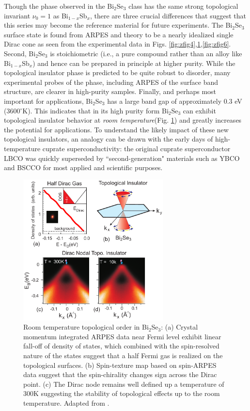\documentclass[twocolumn,floatfix,showpacs,rmp,aps]{revtex4}
\begin{document}
Though the phase observed in the Bi$_2$Se$_3$ class has the same
strong topological invariant $\nu_0=1$ as Bi$_{1-x}$Sb$_x$,
there are three
crucial differences that suggest that this series may become the
reference material for future experiments. The
Bi$_2$Se$_3$ surface state is found from ARPES and theory to be
a nearly idealized single Dirac cone as seen from the experimental
data in Figs. \ref{fig:zfig4},\ref{fig:zfig7},\ref{fig:zfig6}.
Second, Bi$_2$Se$_3$ is stoichiometric (i.e., a pure
compound rather than an alloy like Bi$_{1-x}$Sb$_x$) and hence can be
prepared in principle at higher purity.  While the topological
insulator phase is predicted to be quite robust to disorder, many
experimental probes of the phase, including ARPES of the surface band
structure, are clearer in high-purity samples. Finally, and perhaps
most important for applications, Bi$_2$Se$_3$ has a large band gap of
approximately 0.3 eV (3600$^\circ$K).  This indicates that in its high
purity form Bi$_2$Se$_3$ can exhibit topological insulator behavior at
{\it room temperature}(Fig. \ref{fig:zfig7})
and greatly increases the
potential for applications. To understand the likely impact
of these new topological insulators, an analogy can be drawn with the
early days of high-temperature cuprate superconductivity: the
original cuprate superconductor LBCO was quickly superseded by
``second-generation" materials such as YBCO and BSCCO for most applied
and scientific purposes.

\begin{figure}
\includegraphics[width=3in]{Fig13}
\caption{ Room temperature topological
order in Bi$_2$Se$_3$:  (a) Crystal momentum
integrated ARPES data near Fermi level exhibit linear fall-off of
density of states, which combined with the spin-resolved nature of
the states suggest that a half Fermi gas is realized on the
topological surfaces. (b) Spin-texture map based on spin-ARPES data
suggest that the spin-chirality changes sign across the Dirac point.
(c) The Dirac node remains well
defined up a temperature of 300K suggesting the stability of
topological effects up to the room temperature.  Adapted from .}
\label{fig:zfig7}
\end{figure}
\end{document}

